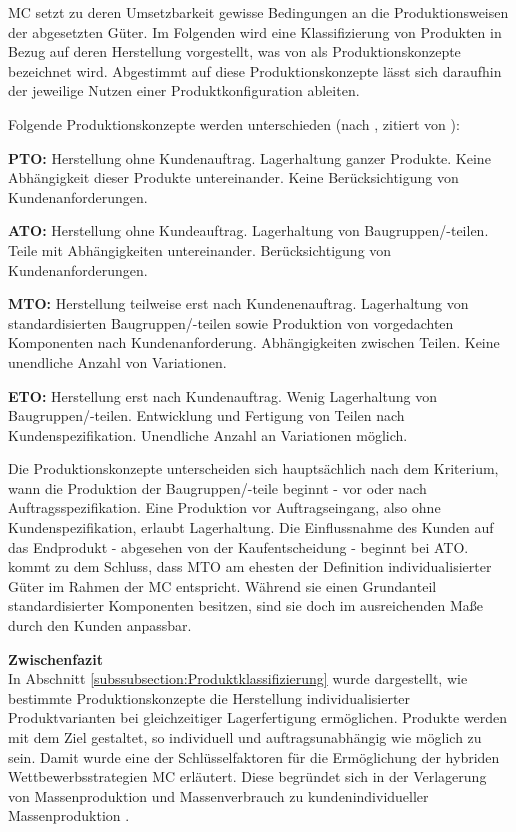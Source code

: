 \documentclass[12pt,a4paper,bibliography=totocnumbered,listof=totoc]{scrartcl}
\begin{document}
\ac{MC} setzt zu deren Umsetzbarkeit gewisse Bedingungen an die Produktionsweisen der abgesetzten Güter. Im Folgenden wird eine Klassifizierung von Produkten in Bezug auf deren Herstellung vorgestellt, was von \citet{schuh06} als Produktionskonzepte bezeichnet wird. Abgestimmt auf diese Produktionskonzepte lässt sich daraufhin der jeweilige Nutzen einer Produktkonfiguration ableiten.

Folgende Produktionskonzepte werden unterschieden (nach \citealt{schuh06}, zitiert von \citealt{lutz11}):
\begin{compactitem}
	\item \textbf{\ac{PTO}:} Herstellung ohne Kundenauftrag. Lagerhaltung ganzer Produkte. Keine Abhängigkeit dieser Produkte untereinander. Keine Berücksichtigung von Kundenanforderungen.
	\item \textbf{\ac{ATO}:} Herstellung ohne Kundeauftrag. Lagerhaltung von Baugruppen/-teilen. Teile mit Abhängigkeiten untereinander. Berücksichtigung von Kundenanforderungen.
	\item \textbf{\ac{MTO}:} Herstellung teilweise erst nach Kundenenauftrag. Lagerhaltung von standardisierten Baugruppen/-teilen sowie Produktion von vorgedachten Komponenten nach Kundenanforderung. Abhängigkeiten zwischen Teilen. Keine unendliche Anzahl von Variationen.
	\item \textbf{\ac{ETO}:} Herstellung erst nach Kundenauftrag. Wenig Lagerhaltung von Baugruppen/-teilen. Entwicklung und Fertigung von Teilen nach Kundenspezifikation. Unendliche Anzahl an Variationen möglich.
\end{compactitem}

Die Produktionskonzepte unterscheiden sich hauptsächlich nach dem Kriterium, wann die Produktion der Baugruppen/-teile beginnt - vor oder nach Auftragsspezifikation. Eine Produktion vor Auftragseingang, also ohne Kundenspezifikation, erlaubt Lagerhaltung. Die Einflussnahme des Kunden auf das Endprodukt - abgesehen von der Kaufentscheidung - beginnt bei \ac{ATO}. \citeauthor{lutz11} kommt zu dem Schluss, dass \ac{MTO} am ehesten der Definition individualisierter Güter im Rahmen der \ac{MC} entspricht. Während sie einen Grundanteil standardisierter Komponenten besitzen, sind sie doch im ausreichenden Maße durch den Kunden anpassbar.

\textbf{Zwischenfazit}\\
In Abschnitt \ref{subssubsection:Produktklassifizierung} wurde dargestellt, wie bestimmte Produktionskonzepte die Herstellung individualisierter Produktvarianten bei gleichzeitiger Lagerfertigung ermöglichen. Produkte werden mit dem Ziel gestaltet, so individuell und auftragsunabhängig wie möglich zu sein. Damit wurde eine der Schlüsselfaktoren für die Ermöglichung der hybriden Wettbewerbsstrategien \ac{MC} erläutert. Diese begründet sich in der Verlagerung von Massenproduktion und Massenverbrauch zu kundenindividueller Massenproduktion \citep{piller98}.
\end{document}
